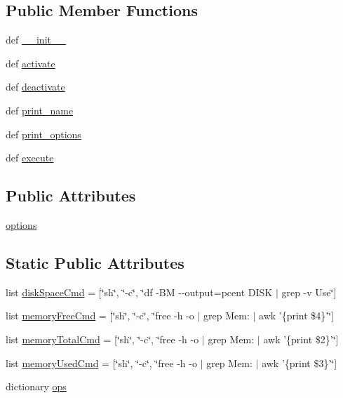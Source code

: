 \subsection*{Public Member Functions}
\begin{DoxyCompactItemize}
\item 
def \hyperlink{classCheckProfile_1_1CheckProfile_a59610ed60307ee5ae57651f34bf9529f}{\-\_\-\-\_\-init\-\_\-\-\_\-}
\item 
def \hyperlink{classCheckProfile_1_1CheckProfile_a24038337f9ee0ed6741e38121fefc8c8}{activate}
\item 
def \hyperlink{classCheckProfile_1_1CheckProfile_ae499aa8259bdb20f403cb1bf84909939}{deactivate}
\item 
def \hyperlink{classCheckProfile_1_1CheckProfile_a7b456afd6026cac14021c21c5ad850f3}{print\-\_\-name}
\item 
def \hyperlink{classCheckProfile_1_1CheckProfile_aee55aa9f7021cb65097a5a485985df7c}{print\-\_\-options}
\item 
def \hyperlink{classCheckProfile_1_1CheckProfile_ad3ef683b23f6127a7a31373d00a7f1dc}{execute}
\end{DoxyCompactItemize}
\subsection*{Public Attributes}
\begin{DoxyCompactItemize}
\item 
\hyperlink{classCheckProfile_1_1CheckProfile_a60bdbb946d15fb43c2e465bb8a3fff99}{options}
\end{DoxyCompactItemize}
\subsection*{Static Public Attributes}
\begin{DoxyCompactItemize}
\item 
list \hyperlink{classCheckProfile_1_1CheckProfile_a074cbe798e2d4fa35fc83aa33a307b6c}{disk\-Space\-Cmd} = \mbox{[}\char`\"{}sh\char`\"{}, \char`\"{}-\/c\char`\"{}, \char`\"{}df -\/B\-M -\/-\/output=pcent D\-I\-S\-K $\vert$ grep -\/v Use\char`\"{}\mbox{]}
\item 
list \hyperlink{classCheckProfile_1_1CheckProfile_a8a9c2299135872cfccf2b0cb25ba854b}{memory\-Free\-Cmd} = \mbox{[}\char`\"{}sh\char`\"{}, \char`\"{}-\/c\char`\"{}, \char`\"{}free -\/h -\/o $\vert$ grep Mem\-: $\vert$ awk '\{print \$4\}'\char`\"{}\mbox{]}
\item 
list \hyperlink{classCheckProfile_1_1CheckProfile_a097bc2442305e7d6eebaff44a53c16f3}{memory\-Total\-Cmd} = \mbox{[}\char`\"{}sh\char`\"{}, \char`\"{}-\/c\char`\"{}, \char`\"{}free -\/h -\/o $\vert$ grep Mem\-: $\vert$ awk '\{print \$2\}'\char`\"{}\mbox{]}
\item 
list \hyperlink{classCheckProfile_1_1CheckProfile_a3c36cf35599b47c7158008533cc9cb39}{memory\-Used\-Cmd} = \mbox{[}\char`\"{}sh\char`\"{}, \char`\"{}-\/c\char`\"{}, \char`\"{}free -\/h -\/o $\vert$ grep Mem\-: $\vert$ awk '\{print \$3\}'\char`\"{}\mbox{]}
\item 
dictionary \hyperlink{classCheckProfile_1_1CheckProfile_aa4e92c1c6def969cc4a347111d4ef0de}{ops}
\end{DoxyCompactItemize}


